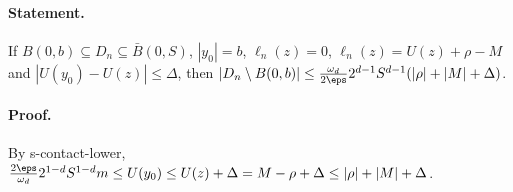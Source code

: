 \paragraph{Statement.} If $B(0,b)\subseteq D_n\subseteq\bar B(0,S)$, $|y_0|=b$, $\ell_n(z)=0$, $\ell_n(z)=U(z)+\rho-M$ and $|U(y_0)-U(z)|\leq\Delta$, then
$|D_n\setminus B(0,b)|\leq\frac{\omega_d}{2\eps}2^{d-1}S^{d-1}(|\rho|+|M|+\Delta)$.
\paragraph{Proof.} By s-contact-lower, $\frac{2\eps}{\omega_d}2^{1-d}S^{1-d}m\leq U(y_0)\leq U(z)+\Delta=M-\rho+\Delta\leq|\rho|+|M|+\Delta$.
